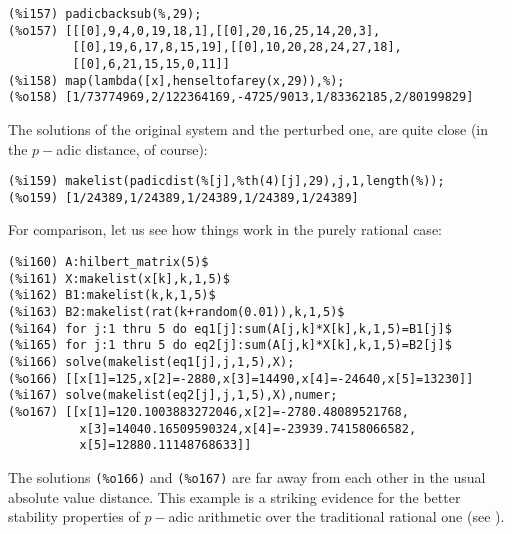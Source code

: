 \documentclass[fleqn]{cas-sc}
\begin{document}
\begin{verbatim}
(%i157)	padicbacksub(%,29);
(%o157)	[[[0],9,4,0,19,18,1],[[0],20,16,25,14,20,3],
         [[0],19,6,17,8,15,19],[[0],10,20,28,24,27,18],
         [[0],6,21,15,15,0,11]]
(%i158)	map(lambda([x],henseltofarey(x,29)),%);
(%o158)	[1/73774969,2/122364169,-4725/9013,1/83362185,2/80199829]
\end{verbatim}

The solutions of the original system and the perturbed one, are quite close
(in the $p-$adic distance, of course):
\begin{verbatim}
(%i159)	makelist(padicdist(%[j],%th(4)[j],29),j,1,length(%));
(%o159)	[1/24389,1/24389,1/24389,1/24389,1/24389]
\end{verbatim}

For comparison, let us see how things work in the purely rational case:
\begin{verbatim}
(%i160)	A:hilbert_matrix(5)$
(%i161)	X:makelist(x[k],k,1,5)$
(%i162)	B1:makelist(k,k,1,5)$
(%i163)	B2:makelist(rat(k+random(0.01)),k,1,5)$
(%i164)	for j:1 thru 5 do eq1[j]:sum(A[j,k]*X[k],k,1,5)=B1[j]$
(%i165)	for j:1 thru 5 do eq2[j]:sum(A[j,k]*X[k],k,1,5)=B2[j]$
(%i166)	solve(makelist(eq1[j],j,1,5),X);
(%o166)	[[x[1]=125,x[2]=-2880,x[3]=14490,x[4]=-24640,x[5]=13230]]
(%i167)	solve(makelist(eq2[j],j,1,5),X),numer;
(%o167)	[[x[1]=120.1003883272046,x[2]=-2780.48089521768,
          x[3]=14040.16509590324,x[4]=-23939.74158066582,
          x[5]=12880.11148768633]]
\end{verbatim}

The solutions \texttt{(\%o166)} and \texttt{(\%o167)} are far away 
from each other in the usual absolute 	value distance. This example
is a striking evidence for the better stability 	properties of $p-$adic
arithmetic over the traditional rational one (see \cite{7,4,3,5,6,11}).


\end{document}
